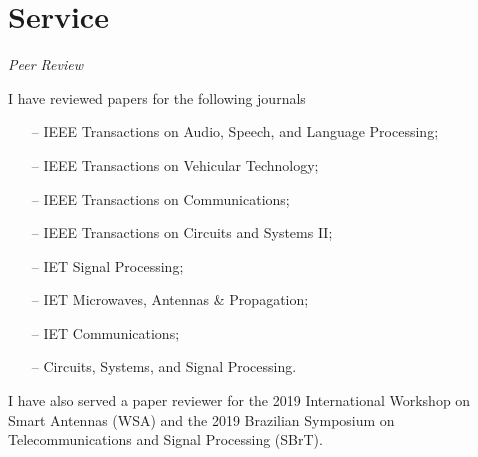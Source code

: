 \section{Service} 

{\sl Peer Review}

I have reviewed papers for the following journals
\begin{itemize}
	\item[--] IEEE Transactions on Audio, Speech, and Language Processing;
	\item[--] IEEE Transactions on Vehicular Technology;
	\item[--] IEEE Transactions on Communications;
	\item[--] IEEE Transactions on Circuits and Systems II;
	\item[--] IET Signal Processing;
	\item[--] IET Microwaves, Antennas \& Propagation;
	\item[--] IET Communications;
	\item[--] Circuits, Systems, and Signal Processing.
\end{itemize}
I have also served a paper reviewer for the 2019 International Workshop on Smart Antennas (WSA) and the 2019 Brazilian Symposium on Telecommunications and Signal Processing (SBrT).